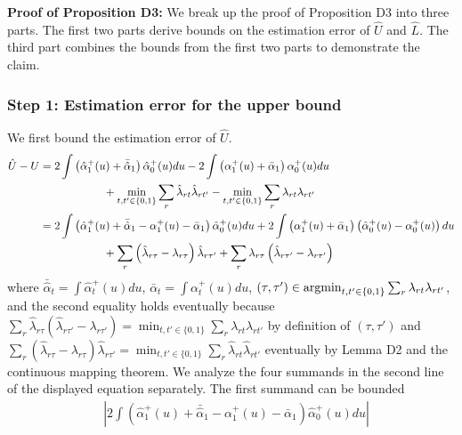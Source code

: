 \documentclass[12pt]{article}
\theoremstyle{definition}
\newcommand{\argmin}{\operatornamewithlimits{argmin}}
\begin{document}
{\begin{flushleft}
\textbf{Proof of Proposition D3:}  We break up the proof of Proposition D3 into three parts. The first two parts derive bounds on the estimation error of $\hat{U}$ and $\hat{L}$. The third part combines the bounds from the first two parts to demonstrate the claim.  
\end{flushleft}

\subsubsection{Step 1: Estimation error for the upper bound}
We first bound the estimation error of $\hat{U}$.
\begin{align*}
\hat{U} - U &= 2\int \left(\hat{\alpha}_1^{+}(u) + \bar{\hat{\alpha}}_{1}\right)\hat{\alpha}_0^+(u) du - 2\int \left(\alpha_1^{+}(u) + \bar{\alpha}_{1}\right)\alpha_0^{+}(u) du \\
&\hspace{20mm}+ \min_{t,t' \in \{0,1\}}\sum_r \hat{\lambda}_{rt}\hat{\lambda}_{rt'} - \min_{t,t' \in \{0,1\}}\sum_r \lambda_{rt}\lambda_{rt'} \\
&= 2\int\left(\hat{\alpha}_1^{+}(u)  + \bar{\hat{\alpha}}_{1} - \alpha_1^{+}(u) - \bar{\alpha}_1 \right)\hat{\alpha}_0^{+}(u)du  + 2\int\left(\alpha_1^{+}(u) + \bar{\alpha}_1 \right)\left( \hat{\alpha}_0^{+}(u) -  \alpha_0^{+}(u)\right)du \\
&\hspace{20mm}+ \sum_{r}\left(\hat{\lambda}_{r\tau} - \lambda_{r\tau}\right)\hat{\lambda}_{r\tau'} +  \sum_{r}\lambda_{r\tau}\left(\hat{\lambda}_{r\tau'} - \lambda_{r\tau'}\right) 
\end{align*}
where $\bar{\hat{\alpha}}_{t} = \int\hat{\alpha}_t^{+}(u)du$, $\bar{\alpha}_{t} = \int\alpha_t^{+}(u)du$, $(\tau, \tau') \in \argmin_{t,t' \in \{0,1\}}\sum_r \lambda_{rt}\lambda_{rt'}$, and the second equality holds eventually because $\sum_{r}\hat{\lambda}_{r\tau}\left(\hat{\lambda}_{r\tau'} - \lambda_{r\tau'}\right) = \min_{t,t' \in \{0,1\}}\sum_r \lambda_{rt}\lambda_{rt'}$ by definition of $(\tau,\tau')$ and $\sum_{r}\left(\hat{\lambda}_{r\tau} - \lambda_{r\tau}\right)\hat{\lambda}_{r\tau'} = \min_{t,t' \in \{0,1\}}\sum_r \hat{\lambda}_{rt}\hat{\lambda}_{rt'}$ eventually by Lemma D2 and the continuous mapping theorem. We analyze the four summands in the second line of the displayed equation separately. The first summand can be bounded   
\begin{align*}
&\left| 2\int\left(\hat{\alpha}_1^{+}(u)  + \bar{\hat{\alpha}}_{1} - \alpha_1^{+}(u) - \bar{\alpha}_1 \right)\hat{\alpha}_0^{+}(u)du\right|  \\

\end{align*}}
\end{document}
